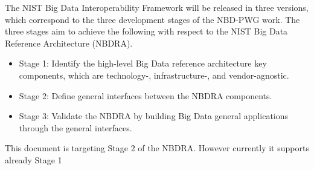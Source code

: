 The NIST Big Data Interoperability Framework will be released in three versions, which correspond to
the three development stages of the NBD-PWG work. The three stages aim to achieve the following with
respect to the NIST Big Data Reference Architecture (NBDRA).

\begin{itemize}
\item Stage 1: Identify the high-level Big Data reference architecture key components, which are
technology-, infrastructure-, and vendor-agnostic.
\item Stage 2: Define general interfaces between the NBDRA components.
\item Stage 3: Validate the NBDRA by building Big Data general applications through the general
interfaces.
\end{itemize}

This document is targeting Stage 2 of the NBDRA. However currently it supports already Stage 1
